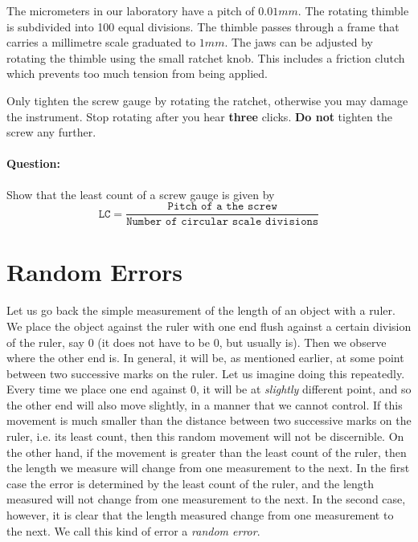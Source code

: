 The micrometers in our laboratory have a pitch of $0.01 mm$.  The rotating thimble is subdivided into 100 equal divisions.  The thimble passes through a frame that carries a millimetre scale graduated to $1 mm$.  The jaws can be adjusted by rotating the thimble using the small ratchet knob.  This includes a friction clutch which prevents too much tension from being applied.

\begin{imp}
Only tighten the screw gauge by rotating the ratchet, otherwise you may damage the instrument. Stop rotating after you hear \textbf{three} clicks. \textbf{Do not} tighten the screw any further.
\end{imp}

\begin{question}
\paragraph{Question:} Show that the least count of a screw gauge is given by
$$\texttt{LC} = \frac{\texttt{Pitch of a the screw}}{\texttt{Number of circular scale divisions}}$$
\end{question}

\section{Random Errors}

Let us go back the simple measurement of the length of an object with a ruler. We place the object against the ruler with one end flush against a certain division of the ruler, say 0 (it does not have to be 0, but usually is). Then we observe where the other end is. In general, it will be, as mentioned earlier, at some point between two successive marks on the ruler. Let us imagine doing this repeatedly. Every time we place one end against 0, it will be at \textit{slightly} different point, and so the other end will also move slightly, in a manner that we cannot control. If this movement is much smaller than the distance between two successive marks on the ruler, i.e. its least count, then this random movement will not be discernible. On the other hand, if the movement is greater than the least count of the ruler, then the length we measure will change from one measurement to the next. In the first case the error is determined by the least count of the ruler, and the length measured will not change from one measurement to the next. In the second case, however, it is clear that the length measured  change from one measurement to the next. We call this kind of error a \textit{random error}.

